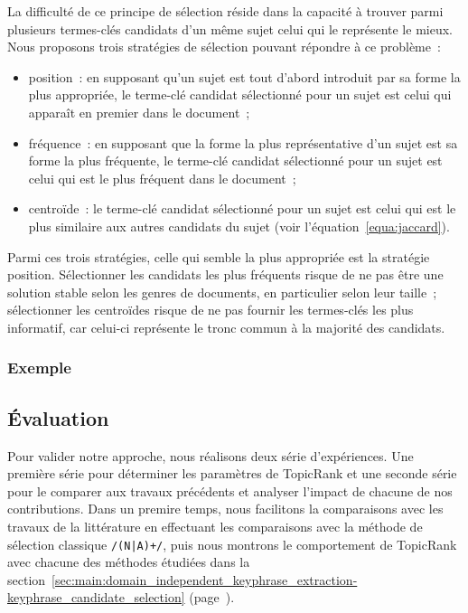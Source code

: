         La difficulté de ce principe de sélection réside dans la capacité à
        trouver parmi plusieurs termes-clés candidats d'un même sujet celui qui
        le représente le mieux. Nous proposons trois stratégies de sélection
        pouvant répondre à ce problème~:
        \begin{itemize}
          \item{position~: en supposant qu'un sujet est tout d'abord
                introduit par sa forme la plus appropriée, le terme-clé
                candidat sélectionné pour un sujet est celui qui apparaît en
                premier dans le document~;}
          \item{fréquence~: en supposant que la forme la plus représentative
                d'un sujet est sa forme la plus fréquente, le terme-clé candidat
                sélectionné pour un sujet est celui qui est le plus fréquent
                dans le document~;}
          \item{centroïde~: le terme-clé candidat sélectionné pour un sujet
                est celui qui est le plus similaire aux autres candidats du
                sujet (voir l'équation~\ref{equa:jaccard}).}
        \end{itemize}
        Parmi ces trois stratégies, celle qui semble la plus appropriée est la
        stratégie position. Sélectionner les candidats les plus fréquents risque
        de ne pas être une solution stable selon les genres de documents, en
        particulier selon leur taille~; sélectionner les centroïdes risque de ne
        pas fournir les termes-clés les plus informatif, car celui-ci représente
        le tronc commun à la majorité des candidats.

      \subsubsection{Exemple}
      \label{subsubsec:main:domain_independent_keyphrase_extraction-unsupervised_automatic_keyphrase_extraction-topicrank-example}

    \subsection{Évaluation}
    \label{subsec:main:domain_independent_keyphrase_extraction-unsupervised_automatic_keyphrase_extraction-evaluation}
      Pour valider notre approche, nous réalisons deux série d'expériences. Une
      première série pour déterminer les paramètres de TopicRank et
      une seconde série pour le comparer aux travaux précédents et analyser
      l'impact de chacune de nos contributions. Dans un premire temps, nous
      facilitons la comparaisons avec les travaux de la littérature en
      effectuant les comparaisons avec la méthode de sélection classique
      \texttt{/(N|A)+/}, puis nous montrons le comportement de TopicRank avec
      chacune des méthodes étudiées dans la
      section~\ref{sec:main:domain_independent_keyphrase_extraction-keyphrase_candidate_selection}
      (page~\pageref{sec:main:domain_independent_keyphrase_extraction-keyphrase_candidate_selection}).
      
